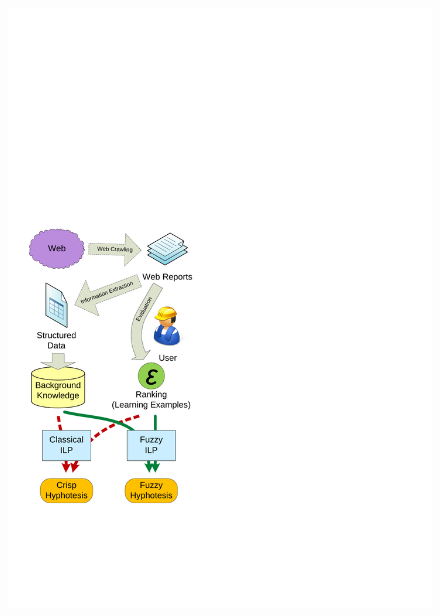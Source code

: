 \begin{figure}[ht]
\begin{minipage}[b]{0.4\hsize}
	\centering
		\includegraphics[width=\hsize]{img/schema}
\caption{}
\label{fig:schema}
\end{minipage}
\hspace{0.5cm}
\begin{minipage}[b]{0.5\hsize}
	\centering

\end{minipage}
\end{figure}

